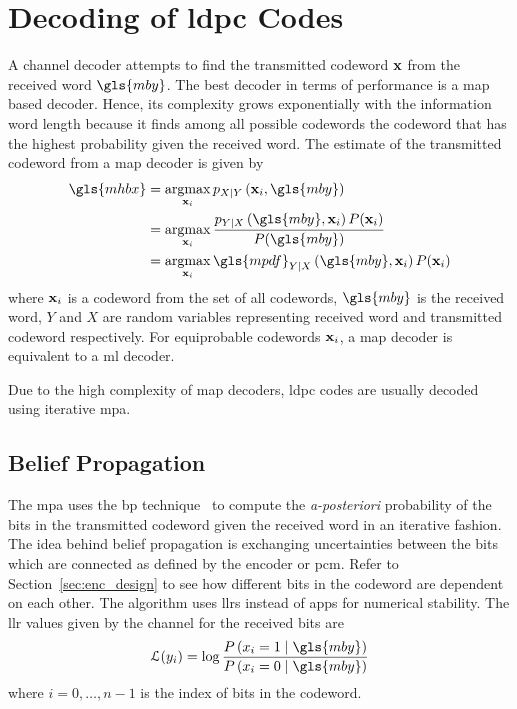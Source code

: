 \section{Decoding of \acrlong{ldpc} Codes}\label{sec:decoding_ldpc}
A channel decoder attempts to find the transmitted codeword $\mathbf{x}$ from the received word $\gls{mby}$. The best decoder in terms of performance is a \gls{map} based decoder. Hence, its complexity grows exponentially with the information word length because it finds among all possible codewords the codeword that has the highest probability given the received word. The estimate of the transmitted codeword from a \gls{map} decoder is given by
\begin{align}
\gls{mhbx}&=\argmax_{\x_i}\pdf_{X\mid Y}\left(\x_i,\gls{mby}\right) \nonumber\\
&=\argmax_{\x_i}\frac{\pdf_{Y\mid X}\left(\gls{mby},\x_i\right)\prob(\x_i)}{\prob(\gls{mby})} \nonumber\\
&=\argmax_{\x_i}\gls{mpdf}_{Y\mid X}\left(\gls{mby},\x_i\right)\prob(\x_i)
\end{align}
where $\mathbf{x}_i$ is a codeword from the set of all codewords, $\gls{mby}$ is the received word, $Y$ and $X$ are random variables representing received word and transmitted codeword respectively. For equiprobable codewords $\mathbf{x}_i$, a \gls{map} decoder is equivalent to a \gls{ml} decoder.

Due to the high complexity of \gls{map} decoders, \gls{ldpc} codes are usually decoded using iterative \acrlong{mpa}.
\subsection{Belief Propagation}
The \gls{mpa} uses the \gls{bp} technique~\cite{Hagenauer1996} to compute the \emph{a-posteriori} probability of the bits in the transmitted codeword given the received word in an iterative fashion. The idea behind belief propagation is exchanging uncertainties between the bits which are connected as defined by the encoder or \gls{pcm}. Refer to Section~\ref{sec:enc_design} to see how different bits in the codeword are dependent on each other. The algorithm uses \glspl{llr} instead of \glspl{app} for numerical stability. The \gls{llr} values given by the channel for the received bits are
\begin{align}\mathcal{L}(y_i)=\log\frac{\prob\left(x_i=1\mid\gls{mby}\right)}{\prob\left(x_i=0\mid\gls{mby}\right)}\end{align}
where $i=0,\dots,n-1$ is the index of bits in the codeword.

